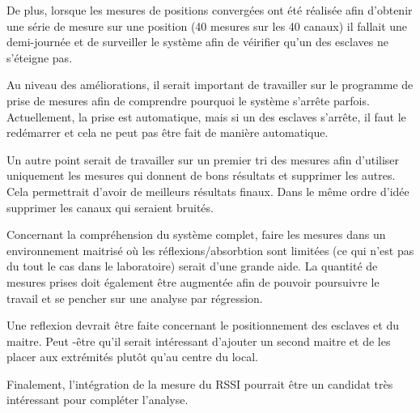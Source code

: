 De plus, lorsque les mesures de positions convergées ont été réalisée afin d'obtenir une série de mesure sur une position (40 mesures sur les 40 canaux) il fallait une demi-journée et de surveiller le système afin de véirifier qu’un des esclaves ne s'éteigne pas. 

Au niveau des améliorations, il serait important de travailler sur le programme de prise de mesures afin de comprendre pourquoi le système s'arrête parfois. Actuellement, la prise est automatique, mais si un des esclaves s'arrête, il faut le redémarrer et cela ne peut pas être fait de manière automatique. 

Un autre point serait de travailler sur un premier tri des mesures afin d'utiliser uniquement les mesures qui donnent de bons résultats et supprimer les autres. Cela permettrait d'avoir de meilleurs résultats finaux. Dans le même ordre d'idée supprimer les canaux qui seraient bruités.

Concernant la compréhension du système complet, faire les mesures dans un environnement maitrisé où les réflexions/absorbtion sont limitées (ce qui n'est pas du tout le cas dans le laboratoire) serait d'une grande aide. La quantité de mesures prises doit également être augmentée afin de pouvoir poursuivre le travail et se pencher sur une analyse par régression. 

Une reflexion devrait être faite concernant le positionnement des esclaves et du maitre. Peut -être qu'il serait intéressant d'ajouter un second maitre et de les placer aux extrémités plutôt qu'au centre du local. 

Finalement, l'intégration de la mesure du RSSI pourrait être un candidat très intéressant pour compléter l'analyse. 







